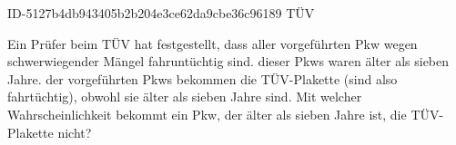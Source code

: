 \begin{exercise}
      {ID-5127b4db943405b2b204e3ce62da9cbe36c96189}
      {TÜV}
  \ifproblem\problem\par
    Ein Prüfer beim TÜV hat festgestellt, dass  aller vorgeführten Pkw
    wegen schwerwiegender Mängel fahruntüchtig sind.  dieser Pkws waren
    älter als sieben Jahre.  der vorgeführten Pkws bekommen die
    TÜV-Plakette (sind also fahrtüchtig), obwohl sie älter als sieben Jahre
    sind. Mit welcher Wahrscheinlichkeit bekommt ein Pkw, der älter als sieben
    Jahre ist, die TÜV-Plakette nicht?
  \fi
\end{exercise}
